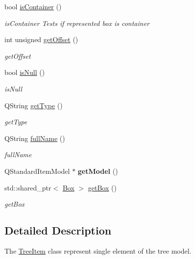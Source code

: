 \begin{DoxyCompactItemize}
bool \hyperlink{class_tree_item_ae047d6d6ac037ed5928d1c099f5ea097}{is\-Container} ()
\begin{DoxyCompactList}\small\item\em is\-Container Tests if represented box is container \end{DoxyCompactList}\item 
int unsigned \hyperlink{class_tree_item_ad025779f60a443c0de1f534aafd41b7b}{get\-Offset} ()
\begin{DoxyCompactList}\small\item\em get\-Offset \end{DoxyCompactList}\item 
bool \hyperlink{class_tree_item_ac7f44a467b5466392cf3330af53afc52}{is\-Null} ()
\begin{DoxyCompactList}\small\item\em is\-Null \end{DoxyCompactList}\item 
Q\-String \hyperlink{class_tree_item_abeb2418adb8d739c6f85ca95243aba88}{get\-Type} ()
\begin{DoxyCompactList}\small\item\em get\-Type \end{DoxyCompactList}\item 
Q\-String \hyperlink{class_tree_item_a5faf2bd42074e0e1dba3126a2cbc0e5a}{full\-Name} ()
\begin{DoxyCompactList}\small\item\em full\-Name \end{DoxyCompactList}\item 
\hypertarget{class_tree_item_a588098933468fd801e8fa11e57053608}{Q\-Standard\-Item\-Model $\ast$ {\bfseries get\-Model} ()}\label{class_tree_item_a588098933468fd801e8fa11e57053608}

\item 
std\-::shared\-\_\-ptr$<$ \hyperlink{class_box}{Box} $>$ \hyperlink{class_tree_item_a3533a32e58f68761a87de666ec2e37bf}{get\-Box} ()
\begin{DoxyCompactList}\small\item\em get\-Box \end{DoxyCompactList}\end{DoxyCompactItemize}


\subsection{Detailed Description}
The \hyperlink{class_tree_item}{Tree\-Item} class represent single element of the tree model. 

